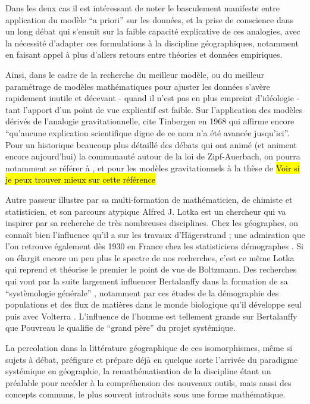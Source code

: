 Dans les deux cas il est intéressant de noter le basculement manifeste entre application du modèle \foreignquote{latin}{a priori} sur les données, et la prise de conscience dans un long débat qui s'ensuit sur la faible capacité explicative de ces analogies, avec la nécessité d'adapter ces formulations à la discipline géographiques, notamment en faisant appel à plus d'allers retours entre théories et données empiriques.

Ainsi, dans le cadre de la recherche du meilleur modèle, ou du meilleur paramétrage de modèles mathématiques pour ajuster les données s'avère rapidement inutile et décevant - quand il n'est pas en plus empreint d'idéologie - tant l'apport d'un point de vue explicatif est faible. Sur l'application des modèles dérivés de l'analogie gravitationnelle, \textcite[37]{Pumain1982} cite Tinbergen en 1968 qui affirme encore \enquote{qu'aucune explication scientifique digne de ce nom n'a été avancée jusqu'ici}. Pour un historique beaucoup plus détaillé des débats qui ont animé (et animent encore aujourd'hui) la communauté autour de la loi de Zipf-Auerbach, on pourra notamment se référer à \textcite{Pumain1982,Pumain2012}, et pour les modèles gravitationnels à la thèse de \autocite{JensenButler1970} \hl{Voir si je peux trouver mieux sur cette référence}

Autre passeur illustre par sa multi-formation de mathématicien, de chimiste et statisticien, et son parcours atypique Alfred J. Lotka est un chercheur qui va inspirer par sa recherche de très nombreuses disciplines. Chez les géographes, on connaît bien l'influence qu'il a sur les travaux d'Hägerstrand \autocite[95]{Claval2007}; une admiration que l'on retrouve également dès 1930 en France chez les statisticiens démographes \autocite{Veron2009}. Si on élargit encore un peu plus le spectre de nos recherches, c'est ce même Lotka qui reprend et théorise le premier le point de vue de Boltzmann. Des recherches qui vont par la suite largement influencer Bertalanffy dans la formation de sa \enquote{systèmologie générale} \autocite[178]{Pouvreau2013}, notamment par ces études de la démographie des populations et des flux de matières dans le monde biologique qu'il développe seul puis avec Volterra \autocite[545-546]{Pouvreau2013}. L'influence de l'homme est tellement grande sur Bertalanffy que Pouvreau le qualifie de \enquote{grand père} du projet systémique.

La percolation dans la littérature géographique de ces isomorphismes, même si sujets à débat, préfigure et prépare déjà en quelque sorte l'arrivée du paradigme systémique en géographie, la remathématisation de la discipline étant un préalable pour accéder à la compréhension des nouveaux outils, mais aussi des concepts communs, le plus souvent introduits sous une forme mathématique. \autocite[432]{Ackerman1963}

